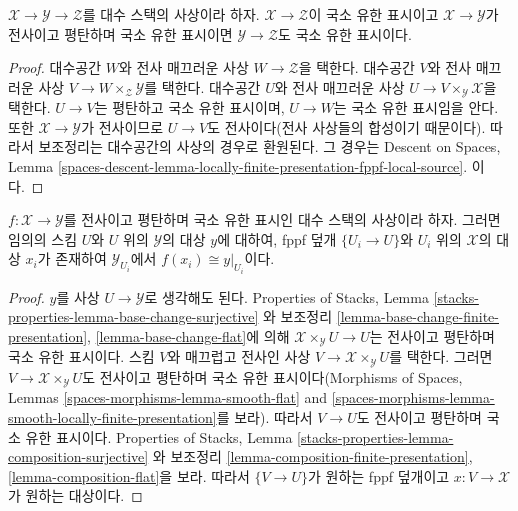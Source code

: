 \begin{lemma}
\label{lemma-flat-finite-presentation-permanence}
$\mathcal{X} \to \mathcal{Y} \to \mathcal{Z}$를 대수 스택의 사상이라
하자. $\mathcal{X} \to \mathcal{Z}$이 국소 유한 표시이고
$\mathcal{X} \to \mathcal{Y}$가 전사이고 평탄하며 국소 유한 표시이면
$\mathcal{Y} \to \mathcal{Z}$도 국소 유한 표시이다.
\end{lemma}

\begin{proof}
대수공간 $W$와 전사 매끄러운 사상 $W \to \mathcal{Z}$을 택한다.
대수공간 $V$와 전사 매끄러운 사상
$V \to W \times_\mathcal{Z} \mathcal{Y}$를 택한다. 대수공간 $U$와
전사 매끄러운 사상 $U \to V \times_\mathcal{Y} \mathcal{X}$을 택한다.
$U \to V$는 평탄하고 국소 유한 표시이며, $U \to W$는 국소 유한
표시임을 안다. 또한 $\mathcal{X} \to \mathcal{Y}$가 전사이므로
$U \to V$도 전사이다(전사 사상들의 합성이기 때문이다).
따라서 보조정리는 대수공간의 사상의 경우로 환원된다. 그 경우는
Descent on Spaces, Lemma
\ref{spaces-descent-lemma-locally-finite-presentation-fppf-local-source}.
이다.
\end{proof}

\begin{lemma}
\label{lemma-surjective-flat-locally-finite-presentation}
$f : \mathcal{X} \to \mathcal{Y}$를 전사이고 평탄하며 국소 유한 표시인
대수 스택의 사상이라 하자. 그러면 임의의 스킴 $U$와 $U$ 위의
$\mathcal{Y}$의 대상 $y$에 대하여, fppf 덮개 $\{U_i \to U\}$와
$U_i$ 위의 $\mathcal{X}$의 대상 $x_i$가 존재하여
$\mathcal{Y}_{U_i}$에서 $f(x_i) \cong y|_{U_i}$이다.
\end{lemma}

\begin{proof}
$y$를 사상 $U \to \mathcal{Y}$로 생각해도 된다. Properties of Stacks,
Lemma
\ref{stacks-properties-lemma-base-change-surjective}
와 보조정리 \ref{lemma-base-change-finite-presentation},
\ref{lemma-base-change-flat}에 의해
$\mathcal{X} \times_\mathcal{Y} U \to U$는 전사이고 평탄하며 국소 유한
표시이다. 스킴 $V$와 매끄럽고 전사인 사상
$V \to \mathcal{X} \times_\mathcal{Y} U$를 택한다. 그러면
$V \to \mathcal{X} \times_\mathcal{Y} U$도
전사이고 평탄하며 국소 유한 표시이다(Morphisms of Spaces, Lemmas
\ref{spaces-morphisms-lemma-smooth-flat} and
\ref{spaces-morphisms-lemma-smooth-locally-finite-presentation}를 보라).
따라서 $V \to U$도 전사이고 평탄하며 국소 유한 표시이다. Properties of
Stacks, Lemma
\ref{stacks-properties-lemma-composition-surjective}
와 보조정리 \ref{lemma-composition-finite-presentation},
\ref{lemma-composition-flat}을 보라. 따라서 $\{V \to U\}$가 원하는
fppf 덮개이고 $x : V \to \mathcal{X}$가 원하는 대상이다.
\end{proof}

